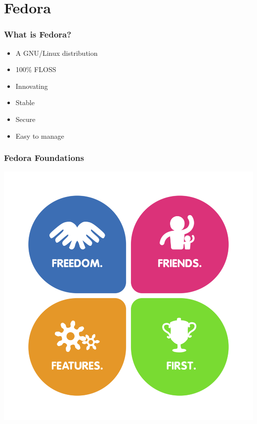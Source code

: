 \documentclass[t,aspectratio=169]{beamer}
\begin{document}
\section{Fedora}
\begin{frame}
    \frametitle{What is Fedora?}
    \begin{itemize}
        \item<2-> A GNU/Linux distribution
        \item<3-> 100\% FLOSS
        \item<4-> Innovating
        \item<5-> Stable
        \item<6-> Secure
        \item<7-> Easy to manage
    \end{itemize}
\end{frame}

\begin{frame}
    \frametitle{Fedora Foundations}
    \begin{center}
        \includegraphics[scale=4.5]{foundations_all.png}
    \end{center}
\end{frame}
\end{document}
